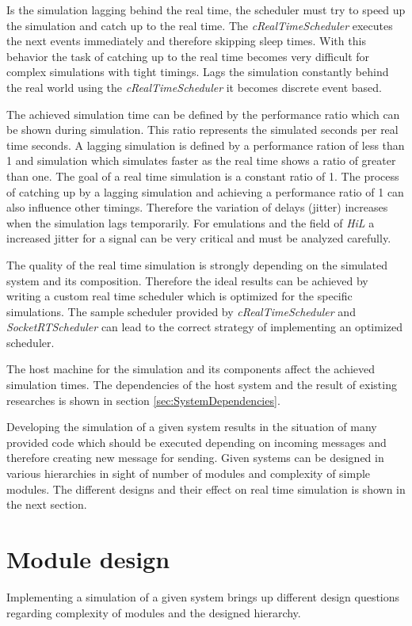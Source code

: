 \documentclass[journal]{IEEEtran}
\begin{document}
Is the simulation lagging behind the real time, the scheduler must try to speed up the simulation and catch up to the real time.
The \emph{cRealTimeScheduler} executes the next events immediately and therefore skipping sleep times.
With this behavior the task of catching up to the real time becomes very difficult for complex simulations with tight timings.
Lags the simulation constantly behind the real world using the \emph{cRealTimeScheduler} it becomes discrete event based.

The achieved simulation time can be defined by the performance ratio which can be shown during simulation.
This ratio represents the simulated seconds per real time seconds.
A lagging simulation is defined by a performance ration of less than 1 and simulation which simulates faster as the real time shows a ratio of greater than one.
The goal of a real time simulation is a constant ratio of 1.
The process of catching up by a lagging simulation and achieving a performance ratio of 1 can also influence other timings.
Therefore the variation of delays (jitter) increases when the simulation lags temporarily.
For emulations and the field of \emph{HiL} a increased jitter for a signal can be very critical and must be analyzed carefully.

The quality of the real time simulation is strongly depending on the simulated system and its composition.
Therefore the ideal results can be achieved by writing a custom real time scheduler which is optimized for the specific simulations.
The sample scheduler provided by \emph{cRealTimeScheduler} and \emph{SocketRTScheduler} can lead to the correct strategy of implementing an optimized scheduler.

The host machine for the simulation and its components affect the achieved simulation times.
The dependencies of the host system and the result of existing researches is shown in section \ref{sec:SystemDependencies}.

Developing the simulation of a given system results in the situation of many provided code which should be executed depending on incoming messages and therefore creating new message for sending.
Given systems can be designed in various hierarchies in sight of number of modules and complexity of simple modules.
The different designs and their effect on real time simulation is shown in the next section.

\section{Module design}
\label{sec:ModuleDesign}
Implementing a simulation of a given system brings up different design questions regarding complexity of modules and the designed hierarchy.
\end{document}
